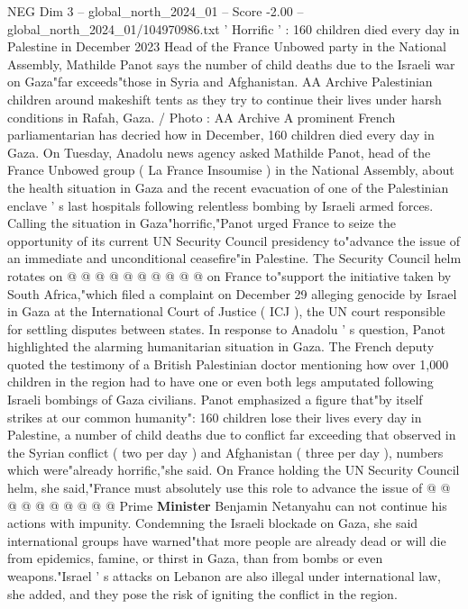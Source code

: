\begin{textsample}{NEG Dim 3 – global\_north\_2024\_01 – Score -2.00 – global\_north\_2024\_01/104970986.txt}  \label{ex:f3_neg_211}
' Horrific ' : 160 children died every day in Palestine in December 2023 Head of the France Unbowed party in the National Assembly, Mathilde Panot says the number of child deaths due to the Israeli war on Gaza"far exceeds"those in Syria and Afghanistan.
AA Archive Palestinian children around makeshift tents as they try to continue their lives under harsh conditions in Rafah, Gaza. / Photo : AA Archive A prominent French parliamentarian has decried how in December, 160 children died every day in Gaza.
On Tuesday, Anadolu news agency asked Mathilde Panot, head of the France Unbowed group ( La France Insoumise ) in the National Assembly, about the health situation in Gaza and the recent evacuation of one of the Palestinian enclave ' s last hospitals following relentless bombing by Israeli armed forces.
Calling the situation in Gaza"horrific,"Panot urged France to seize the opportunity of its current UN Security Council presidency to"advance the issue of an immediate and unconditional ceasefire"in Palestine.
The Security Council helm rotates on @ @ @ @ @ @ @ @ @ @ on France to"support the initiative taken by South Africa,"which filed a complaint on December 29 alleging genocide by Israel in Gaza at the International Court of Justice ( ICJ ), the UN court responsible for settling disputes between states.
In response to Anadolu ' s question, Panot highlighted the alarming humanitarian situation in Gaza.
The French deputy quoted the testimony of a British Palestinian doctor mentioning how over 1,000 children in the region had to have one or even both legs amputated following Israeli bombings of Gaza civilians.
Panot emphasized a figure that"by itself strikes at our common humanity": 160 children lose their lives every day in Palestine, a number of child deaths due to conflict far exceeding that observed in the Syrian conflict ( two per day ) and Afghanistan ( three per day ), numbers which were"already horrific,"she said.
On France holding the UN Security Council helm, she said,"France must absolutely use this role to advance the issue of @ @ @ @ @ @ @ @ @ @ Prime \textbf{Minister} Benjamin Netanyahu can not continue his actions with impunity.
Condemning the Israeli blockade on Gaza, she said international groups have warned"that more people are already dead or will die from epidemics, famine, or thirst in Gaza, than from bombs or even weapons."Israel ' s attacks on Lebanon are also illegal under international law, she added, and they pose the risk of igniting the conflict in the region.

\end{textsample}
